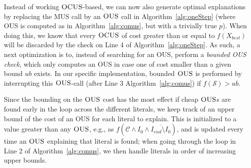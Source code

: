 \documentclass[twoside,11pt]{article}
\newcommand\m[1]{\mathcal{#1}}
\newcommand\Iend{\ensuremath{I_\mathit{end} }\xspace}
\newcommand\formulac{\ensuremath{\m{C} }\xspace}
\newcommand\mm[1]{\ensuremath{#1}\xspace}
\newcommand\call[1]{\mm{\textsc{#1}}}
\newcommand\omus{\mm{\call{OUS}}}
\newcommand\comus{\mm{\call{OCUS}}}
\begin{document}
Instead of working \comus-based, we can now also generate optimal explanations by replacing the MUS call by an \omus call  in Algorithm~\ref{alg:oneStep} (where OUS is computed as in Algorithm~\ref{alg:comus}, but with a trivially true $p$). 
When doing this, we know that every \comus of cost greater than or equal to $f(X_{\mathit{best}})$ will be discarded by the check on Line 4 of Algorithm~\ref{alg:oneStep}.
As such, a next optimization is to, instead of searching for an OUS, perform a \emph{bounded OUS check}, which only computes an OUS in case one of cost smaller than a given bound $\mathit{ub}$ exists.  
In our specific implementation, bounded \omus is performed by interrupting this \omus-call (after Line 3 Algorithm~\ref{alg:comus}) if $f(\m{S}) > \mathit{ub}$.

Since the bounding on the \omus cost has the most effect if cheap \omus{}s are found early in the loop across the different literals, we keep track of an upper bound of the cost of an OUS for each literal to explain. This is initialized to a value greater than any \omus, e.g., as $f(\formulac \land I_0 \land \overline{\Iend \setminus I_0})$, and is updated every time an \omus explaining that literal is found; when going through the loop in Line 2 of Algorithm~\ref{alg:comus}, we then handle literals in order of increasing upper bounds.

\clearpage
\end{document}

